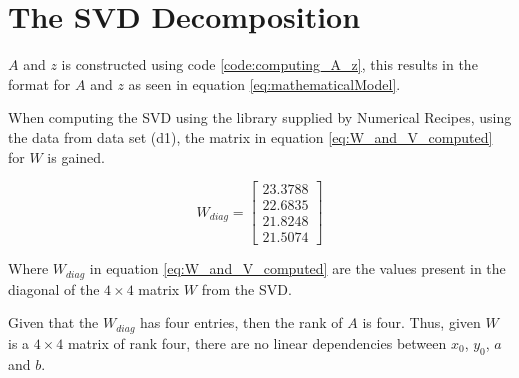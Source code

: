 \section{The SVD Decomposition}

$A$ and $z$ is constructed using code \ref{code:computing_A_z}, this results in the format for $A$ and $z$ as seen in equation \ref{eq:mathematicalModel}.



When computing the SVD using the library supplied by Numerical Recipes, using the data from data set (d1), the matrix in equation \ref{eq:W_and_V_computed} for $W$
is gained.

\begin{equation}
W_{diag} = 
\left[
\begin{array}{c}
23.3788 \\
22.6835 \\
21.8248 \\
21.5074
\end{array}
\right]
\label{eq:W_and_V_computed}
\end{equation}

Where $W_{diag}$ in equation \ref{eq:W_and_V_computed} are the values present in the diagonal of the $4 \times 4$ matrix $W$ from the SVD.

Given that the $W_{diag}$ has four entries, then the rank of $A$ is four. Thus, given $W$ is a $4 \times 4$ matrix of rank four, there are no linear dependencies between $x_0$, $y_0$, $a$ and $b$.
